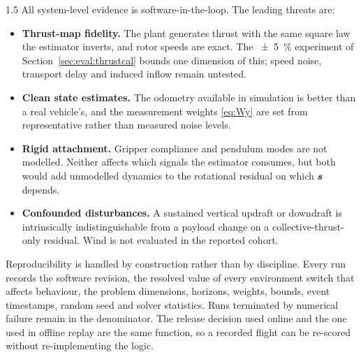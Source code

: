 \begin{spacing}{1.5}
All system-level evidence is software-in-the-loop. The leading threats are:

\begin{itemize}
\item \textbf{Thrust-map fidelity.} The plant generates thrust with the same
square law the estimator inverts, and rotor speeds are exact. The
\SI{\pm5}{\percent} experiment of Section~\ref{sec:eval:thrustcal} bounds one
dimension of this; speed noise, transport delay and induced inflow
\cite{bangura2012} remain untested.
\item \textbf{Clean state estimates.} The odometry available in simulation is
better than a real vehicle's, and the measurement weights \eqref{eq:Wy} are set
from representative rather than measured noise levels.
\item \textbf{Rigid attachment.} Gripper compliance and pendulum modes are not
modelled. Neither affects which signals the estimator consumes, but both would
add unmodelled dynamics to the rotational residual on which $\bm{s}$ depends.
\item \textbf{Confounded disturbances.} A sustained vertical updraft or downdraft
is intrinsically indistinguishable from a payload change on a
collective-thrust-only residual. Wind is not evaluated in the reported cohort.
\end{itemize}

Reproducibility is handled by construction rather than by discipline. Every run
records the software revision, the resolved value of every environment switch
that affects behaviour, the problem dimensions, horizons, weights, bounds, event
timestamps, random seed and solver statistics. Runs terminated by numerical
failure remain in the denominator. The release decision used online and the one
used in offline replay are the same function, so a recorded flight can be
re-scored without re-implementing the logic.


\end{spacing}
